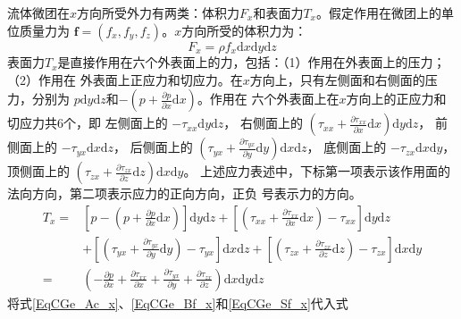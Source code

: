 流体微团在$x$方向所受外力有两类：体积力$F_{x}$和表面力$T_{x}$。假定作用在微团上的单位质量力为
$\mathbf{f}=(f_{x}, f_{y}, f_{z})$。$x$方向所受的体积力为：
\begin{equation}
  F_{x} = \rho f_{x}\mathrm{d}x\mathrm{d}y\mathrm{d}z
  \label{EqCGe_Bf_x}
\end{equation}
表面力$T_{x}$是直接作用在六个外表面上的力，包括：（1）作用在外表面上的压力；（2）作用在
外表面上正应力和切应力。在$x$方向上，只有左侧面和右侧面的压力，分别为
$p\mathrm{d}y\mathrm{d}z$和$-(p+\frac{\partial p}{\partial x}\mathrm{d}x)$。作用在
六个外表面上在$x$方向上的正应力和切应力共6个，即
左侧面上的
$-\tau_{xx}\mathrm{d}y\mathrm{d}z$，
右侧面上的
$(\tau_{xx}+\frac{\partial \tau_{xx}}{\partial x}\mathrm{d}x)\mathrm{d}y\mathrm{d}z$，
前侧面上的
$-\tau_{yx}\mathrm{d}x\mathrm{d}z$，
后侧面上的
$(\tau_{yx}+\frac{\partial \tau_{yx}}{\partial y}\mathrm{d}y)\mathrm{d}x\mathrm{d}z$，
底侧面上的
$-\tau_{zx}\mathrm{d}x\mathrm{d}y$，
顶侧面上的
$(\tau_{zx}+\frac{\partial \tau_{zx}}{\partial z}\mathrm{d}z)\mathrm{d}x\mathrm{d}y$。
上述应力表述中，下标第一项表示该作用面的法向方向，第二项表示应力的正向方向，正负
号表示力的方向。
\begin{equation}
  \begin{aligned}
    T_{x} =&
    \left[
      p -
      \left(
        p +
        \frac{\partial p}{\partial x}\mathrm{d}x
      \right)
    \right]\mathrm{d}y\mathrm{d}z
    +
    \left[
      \left(
        \tau_{xx} +
        \frac{\partial \tau_{xx}}{\partial x}\mathrm{d}x
      \right)
      - \tau_{xx}
    \right]\mathrm{d}y\mathrm{d}z \\
           & +
           \left[
             \left(
               \tau_{yx} +
               \frac{\partial \tau_{yx}}{\partial y}\mathrm{d}y
             \right)
             - \tau_{yx}
           \right]\mathrm{d}x\mathrm{d}z
           +
           \left[
             \left(
               \tau_{zx} +
               \frac{\partial \tau_{zx}}{\partial z}\mathrm{d}z
             \right)
             - \tau_{zx}
           \right]\mathrm{d}x\mathrm{d}y
           \\
    =&
    \left(
      -\frac{\partial p}{\partial x}
      +\frac{\partial \tau_{xx}}{\partial x}
      +\frac{\partial \tau_{yx}}{\partial y}
      +\frac{\partial \tau_{zx}}{\partial z}
    \right)
    \mathrm{d}x\mathrm{d}y\mathrm{d}z
  \end{aligned}
  \label{EqCGe_Sf_x}
\end{equation}
将式\eqref{EqCGe_Ac_x}、\eqref{EqCGe_Bf_x}和\eqref{EqCGe_Sf_x}代入式
